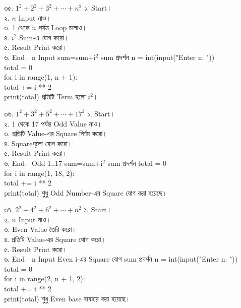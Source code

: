 
\exerciseTable
{৩৫. \(1^2+2^2+3^2+\cdots+n^2\)}
{
১. Start।\\
২. \(n\) Input নাও।\\
৩. 1 থেকে \(n\) পর্যন্ত Loop চালাও।\\
৪. \(i^2\) Sum-এ যোগ করো।\\
৫. Result Print করো।\\
৬. End।
}
{
\linearflow
{n Input}
{sum=sum+i\(^2\)}
{sum প্রদর্শন}
}
{
n = int(input("Enter n: "))\\
total = 0\\
for i in range(1, n + 1):\\
\hspace*{4mm}total += i ** 2\\
print(total)
}
{
প্রতিটি Term হলো \(i^2\)।
}


\exerciseTable
{৩৬. \(1^2+3^2+5^2+\cdots+17^2\)}
{
১. Start।\\
২. 1 থেকে 17 পর্যন্ত Odd Value নাও।\\
৩. প্রতিটি Value-এর Square নির্ণয় করো।\\
৪. Squareগুলো যোগ করো।\\
৫. Result Print করো।\\
৬. End।
}
{
\linearflow
{Odd 1..17}
{sum=sum+i\(^2\)}
{sum প্রদর্শন}
}
{
total = 0\\
for i in range(1, 18, 2):\\
\hspace*{4mm}total += i ** 2\\
print(total)
}
{
শুধু Odd Number-এর Square যোগ করা হয়েছে।
}


\exerciseTable
{৩৭. \(2^2+4^2+6^2+\cdots+n^2\)}
{
১. Start।\\
২. \(n\) Input নাও।\\
৩. Even Value তৈরি করো।\\
৪. প্রতিটি Value-এর Square যোগ করো।\\
৫. Result Print করো।\\
৬. End।
}
{
\linearflow
{n Input}
{Even i-এর Square যোগ}
{sum প্রদর্শন}
}
{
n = int(input("Enter n: "))\\
total = 0\\
for i in range(2, n + 1, 2):\\
\hspace*{4mm}total += i ** 2\\
print(total)
}
{
শুধু Even base ব্যবহার করা হয়েছে।
}


